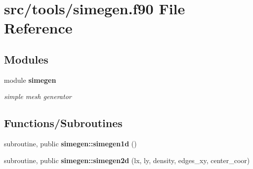 \section{src/tools/simegen.f90 File Reference}
\label{simegen_8f90}
\subsection*{Modules}
\begin{DoxyCompactItemize}
\item 
module {\bf simegen}
\begin{DoxyCompactList}\small\item\em simple mesh generator \end{DoxyCompactList}\end{DoxyCompactItemize}
\subsection*{Functions/\+Subroutines}
\begin{DoxyCompactItemize}
\item 
subroutine, public {\bf simegen\+::simegen1d} ()
\item 
subroutine, public {\bf simegen\+::simegen2d} (lx, ly, density, edges\+\_\+xy, center\+\_\+coor)
\end{DoxyCompactItemize}
